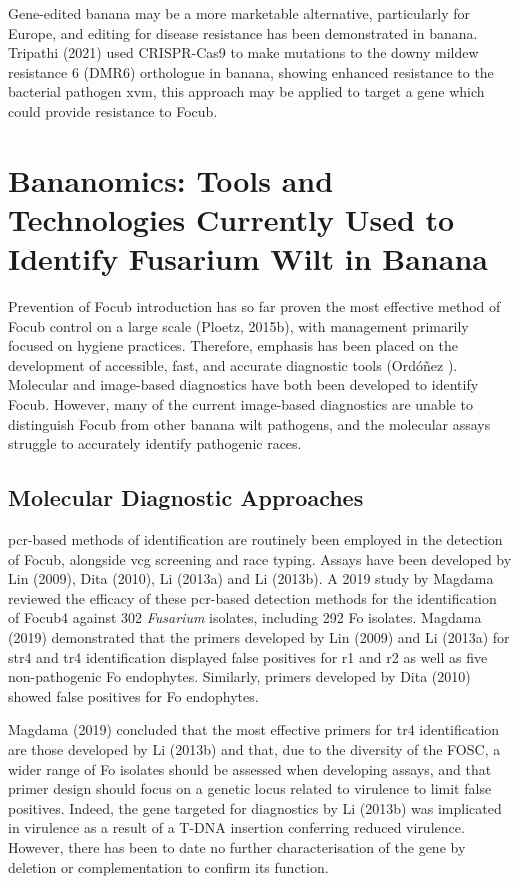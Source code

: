 Gene-edited banana may be a more marketable alternative, particularly for Europe, and editing for disease resistance has been demonstrated in banana. Tripathi \et (2021) used CRISPR-Cas9 to make mutations to the downy mildew resistance 6 (DMR6) orthologue in banana, showing enhanced resistance to the bacterial pathogen \ac{xvm}, this approach may be applied to target a gene which could provide resistance to \ac{Focub}.  

\section{Bananomics: Tools and Technologies Currently Used to Identify Fusarium Wilt  in Banana}

Prevention of \ac{Focub} introduction has so far proven the most effective method of \ac{Focub} control on a large scale (Ploetz, 2015b), with management primarily focused on hygiene practices. Therefore, emphasis has been placed on the development of accessible, fast, and accurate diagnostic tools (Ordóñez ). Molecular and image-based diagnostics have both been developed to identify \ac{Focub}. However, many of the current image-based diagnostics are unable to distinguish \ac{Focub} from other banana wilt pathogens, and the molecular assays struggle to accurately identify pathogenic races.  

\subsection{Molecular Diagnostic Approaches}
\Ac{pcr}-based methods of identification are routinely been employed in the detection of \ac{Focub}, alongside \ac{vcg} screening and race typing. Assays have been developed by Lin \et (2009), Dita \et (2010), Li \et (2013a) and Li \et (2013b). A 2019 study by Magdama \et reviewed the efficacy of these \ac{pcr}-based detection methods for the identification of \ac{Focub4} against 302 \textit{Fusarium} isolates, including 292 \ac{Fo} isolates. Magdama \et (2019) demonstrated that the primers developed by Lin \et (2009) and Li \et (2013a) for \ac{str4} and \ac{tr4} identification displayed false positives for \ac{r1} and \ac{r2} as well as five non-pathogenic \ac{Fo} endophytes. Similarly, primers developed by Dita \et (2010) showed false positives for \ac{Fo} endophytes. 

Magdama \et (2019) concluded that the most effective primers for \ac{tr4} identification are those developed by Li \et (2013b) and that, due to the diversity of the \ac{FOSC}, a wider range of \ac{Fo} isolates should be assessed when developing assays, and that primer design should focus on a genetic locus related to virulence to limit false positives.  Indeed, the gene targeted for diagnostics by Li \et (2013b) was implicated in virulence as a result of a T-DNA insertion conferring reduced virulence. However, there has been to date no further characterisation of the gene by deletion or complementation to confirm its function.  

